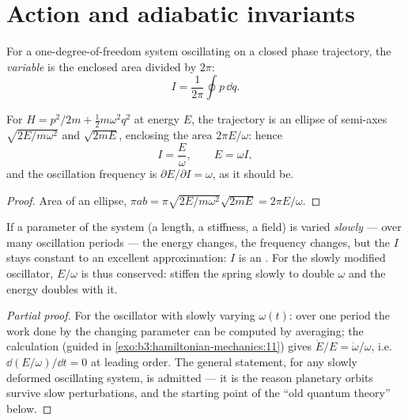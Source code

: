 \section{Action and adiabatic invariants}

\begin{definition}\label{def:b3:hamiltonian-mechanics:action-variable}
For a one-degree-of-freedom system oscillating on a closed phase
trajectory, the \emph{ variable} is the enclosed area divided by
$2\pi$:
\[
I = \frac{1}{2\pi}\oint p\,\dd q .
\]
\end{definition}

\begin{proposition}\label{prop:b3:hamiltonian-mechanics:sho-action}
For $H = p^2/2m + \tfrac12 m\omega^2q^2$ at energy $E$, the trajectory
is an ellipse of semi-axes $\sqrt{2E/m\omega^2}$ and $\sqrt{2mE}$,
enclosing the area $2\pi E/\omega$: hence
\[
I = \frac{E}{\omega} , \qquad E = \omega I ,
\]
and the oscillation frequency is $\partial E/\partial I = \omega$, as
it should be.
\end{proposition}

\begin{proof}
Area of an ellipse, $\pi ab = \pi\sqrt{2E/m\omega^2}\sqrt{2mE} =
2\pi E/\omega$.
\end{proof}

\begin{proposition}\label{prop:b3:hamiltonian-mechanics:adiabatic}
If a parameter of the system (a length, a stiffness, a field) is
varied \emph{slowly} --- over many oscillation periods --- the energy
changes, the frequency changes, but the  $I$ stays constant to
an excellent approximation: $I$ is an \emph{}. For
the slowly modified oscillator, $E/\omega$ is thus conserved: stiffen
the spring slowly to double $\omega$ and the energy doubles with it.
\end{proposition}

\begin{proof}[Partial proof]
For the oscillator with slowly varying $\omega(t)$: over one period
the work done by the changing parameter can be computed by averaging;
the calculation (guided in \cref{exo:b3:hamiltonian-mechanics:11})
gives $\dot E/E = \dot\omega/\omega$, i.e.\ $\dd(E/\omega)/\dd t = 0$
at leading order. The general statement, for any slowly deformed
oscillating system, is admitted --- it is the reason planetary orbits
survive slow perturbations, and the starting point of the ``old
quantum theory'' below.
\end{proof}

